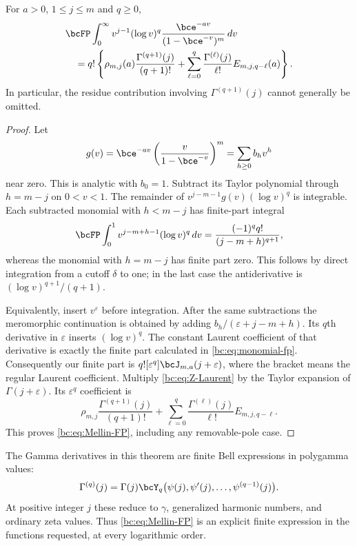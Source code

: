 \begin{theorem}
\label{bc:thm:mellin-fp}
For $a>0$, $1\le j\le m$ and $q\ge0$,
\begin{align}
 &\bcFP\int_0^\infty v^{j-1}(\log v)^q
                  \frac{\bce^{-av}}{(1-\bce^{-v})^m}\,dv\notag\\
 &\quad=q!\left\{
     \rho_{m,j}(a)\frac{\Gamma^{(q+1)}(j)}{(q+1)!}
     +\sum_{\ell=0}^q
         \frac{\Gamma^{(\ell)}(j)}{\ell!}
                     E_{m,j,q-\ell}(a)\right\}.
 \label{bc:eq:Mellin-FP}
\end{align}
In particular, the residue contribution involving
$\Gamma^{(q+1)}(j)$ cannot generally be omitted.
\end{theorem}
\begin{proof}
Let
\[
 g(v)=\bce^{-av}\left(\frac{v}{1-\bce^{-v}}\right)^m
                      =\sum_{h\ge0}b_hv^h
\]
near zero. This is analytic with $b_0=1$. Subtract its Taylor polynomial
through $h=m-j$ on $0<v<1$. The remainder of
$v^{j-m-1}g(v)(\log v)^q$ is integrable. Each subtracted monomial with
$h<m-j$ has finite-part integral
\begin{equation}\label{bc:eq:monomial-fp}
 \bcFP\int_0^1v^{j-m+h-1}(\log v)^q\,dv
   =\frac{(-1)^qq!}{(j-m+h)^{q+1}},
\end{equation}
whereas the monomial with $h=m-j$ has finite part zero. This follows
by direct integration from a cutoff $\delta$ to one; in the last case
the antiderivative is $(\log v)^{q+1}/(q+1)$.

Equivalently, insert $v^\varepsilon$ before integration. After the same
subtractions the meromorphic continuation is obtained by adding
$b_h/(\varepsilon+j-m+h)$. Its $q$th derivative in $\varepsilon$
inserts $(\log v)^q$. The constant Laurent coefficient of that derivative
is exactly the finite part calculated in \eqref{bc:eq:monomial-fp}.
Consequently our finite part is
$q![\varepsilon^q]\bcJ_{m,a}(j+\varepsilon)$, where the bracket means
the regular Laurent coefficient. Multiply
\eqref{bc:eq:Z-Laurent} by the Taylor expansion of
$\Gamma(j+\varepsilon)$. Its $\varepsilon^q$ coefficient is
\[
 \rho_{m,j}\frac{\Gamma^{(q+1)}(j)}{(q+1)!}
 +\sum_{\ell=0}^q\frac{\Gamma^{(\ell)}(j)}{\ell!}E_{m,j,q-\ell}.
\]
This proves \eqref{bc:eq:Mellin-FP}, including any removable-pole case.
\end{proof}

The Gamma derivatives in this theorem are finite Bell expressions in
polygamma values:
\begin{equation}\label{bc:eq:Gamma-Bell}
 \Gamma^{(q)}(j)=\Gamma(j)
          \bcY_q\bigl(\psi(j),\psi'(j),\ldots,\psi^{(q-1)}(j)\bigr).
\end{equation}
At positive integer $j$ these reduce to $\gamma$, generalized harmonic
numbers, and ordinary zeta values. Thus \eqref{bc:eq:Mellin-FP} is an
explicit finite expression in the functions requested, at every
logarithmic order.

